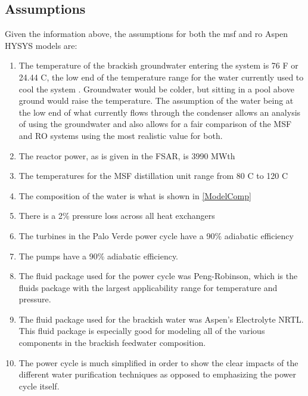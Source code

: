 \subsection{Assumptions}
% 
% 
% 
% 

Given the information above, the assumptions for both the \ac{msf} and \ac{ro} Aspen HYSYS models are:
\begin{enumerate}
\item The temperature of the brackish groundwater entering the system is 76 \degree F or 24.44 \degree C, the low end of the temperature range for the water currently used to cool the system \cite{Brown2018}. Groundwater would be colder, but sitting in a pool above ground would raise the temperature. The assumption of the water being at the low end of what currently flows through the condenser allows an analysis of using the groundwater and also allows for a fair comparison of the MSF and RO systems using the most realistic value for both.
\item The reactor power, as is given in the FSAR, is 3990 MWth
\item The temperatures for the MSF distillation unit range from 80 \degree C to 120 \degree C
\item The composition of the water is what is shown in \ref{ModelComp}
\item There is a 2\% pressure loss across all heat exchangers
\item The turbines in the Palo Verde power cycle have a 90\% adiabatic efficiency
\item The pumps have a 90\% adiabatic efficiency.
\item The fluid package used for the power cycle was Peng-Robinson, which is the fluids package with the largest applicability range for temperature and pressure.
\item The fluid package used for the brackish water was Aspen's Electrolyte NRTL. This fluid package is especially good for modeling all of the various components in the brackish feedwater composition.
\item The power cycle is much simplified in order to show the clear impacts of the different water purification techniques as opposed to emphasizing the power cycle itself.
\end{enumerate}

